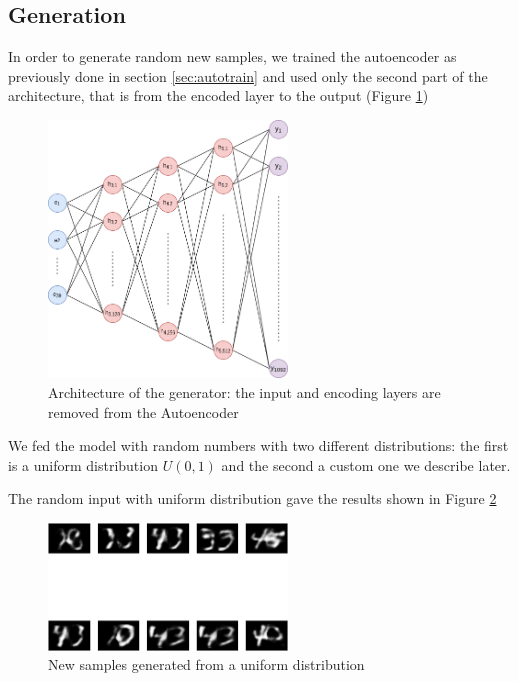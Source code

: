 \documentclass[compsoc]{IEEEtran}
\begin{document}
\subsection{Generation}
In order to generate random new samples, we trained the autoencoder as previously done in section \ref{sec:autotrain} and used only the second part of the architecture, that is 
from the encoded layer to the output (Figure \ref{fig:generator})


\begin{figure}[ht!]
\centering                                                                        
\includegraphics[width=2.5in]{generator.png}
\captionsetup{justification=centering}
\caption{Architecture of the generator: the input and encoding layers are removed from the Autoencoder}
\label{fig:generator}
\end{figure}

We fed the model with random numbers with two different distributions: the first is a uniform distribution $U(0, 1)$ and the second a custom one we describe later.\par
The random input with uniform distribution gave the results shown in Figure \ref{fig:unif}

\begin{figure}[ht!]
\centering                                                                        
\includegraphics[width=2.5in]{unif.png}
\captionsetup{justification=centering}
\caption{New samples generated from a uniform distribution}
\label{fig:unif}
\end{figure}
\end{document}

